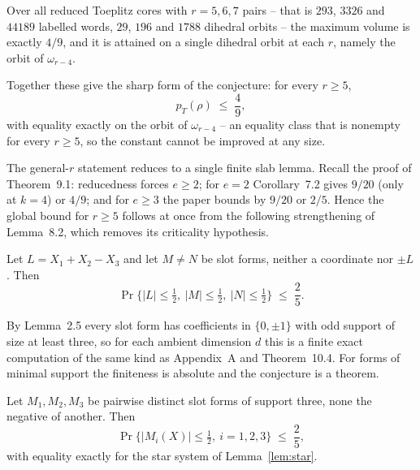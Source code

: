 \begin{proposition}\label{prop:49exh}
Over all reduced Toeplitz cores with $r=5,6,7$ pairs -- that is $293$,
$3326$ and $44189$ labelled words, $29$, $196$ and $1788$ dihedral orbits
-- the maximum volume is exactly $4/9$, and it is attained on a single
dihedral orbit at each $r$, namely the orbit of $\omega_{r-4}$.
\end{proposition}

Together these give the sharp form of the conjecture: for every $r\ge5$,
\[
p_T(\rho)\;\le\;\frac49 ,
\]
with equality exactly on the orbit of $\omega_{r-4}$ -- an equality class
that is nonempty for every $r\ge5$, so the constant cannot be improved at
any size.

The general-$r$ statement reduces to a single finite slab lemma.  Recall
the proof of Theorem~9.1: reducedness forces $e\ge2$; for $e=2$
Corollary~7.2 gives $9/20$ (only at $k=4$) or $4/9$; and for $e\ge3$ the
paper bounds by $9/20$ or $2/5$.  Hence the global bound for $r\ge5$
follows at once from the following strengthening of Lemma~8.2, which
removes its criticality hypothesis.

\begin{conjecture}\label{conj:threeslab}
Let $L=X_1+X_2-X_3$ and let $M\ne N$ be slot forms, neither a coordinate
nor $\pm L$.  Then
\[
\Pr\bigl\{|L|\le\tfrac12,\ |M|\le\tfrac12,\ |N|\le\tfrac12\bigr\}
\;\le\;\frac25 .
\]
\end{conjecture}

By Lemma~2.5 every slot form has coefficients in $\{0,\pm1\}$ with odd
support of size at least three, so for each ambient dimension $d$ this is
a finite exact computation of the same kind as Appendix~A and
Theorem~10.4.  For forms of minimal support the finiteness is absolute
and the conjecture is a theorem.

\begin{proposition}\label{prop:threetri}
Let $M_1,M_2,M_3$ be pairwise distinct slot forms of support three, none
the negative of another.  Then
\[
\Pr\bigl\{|M_i(X)|\le\tfrac12,\ i=1,2,3\bigr\}\;\le\;\frac25 ,
\]
with equality exactly for the star system of Lemma~\ref{lem:star}.
\end{proposition}


